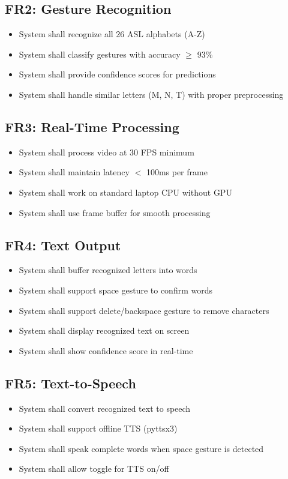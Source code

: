 \subsection{FR2: Gesture Recognition}
\begin{itemize}
    \item System shall recognize all 26 ASL alphabets (A-Z)
    \item System shall classify gestures with accuracy $\ge$ 93\%
    \item System shall provide confidence scores for predictions
    \item System shall handle similar letters (M, N, T) with proper preprocessing
\end{itemize}

\subsection{FR3: Real-Time Processing}
\begin{itemize}
    \item System shall process video at 30 FPS minimum
    \item System shall maintain latency $<$ 100ms per frame
    \item System shall work on standard laptop CPU without GPU
    \item System shall use frame buffer for smooth processing
\end{itemize}

\subsection{FR4: Text Output}
\begin{itemize}
    \item System shall buffer recognized letters into words
    \item System shall support space gesture to confirm words
    \item System shall support delete/backspace gesture to remove characters
    \item System shall display recognized text on screen
    \item System shall show confidence score in real-time
\end{itemize}

\subsection{FR5: Text-to-Speech}
\begin{itemize}
    \item System shall convert recognized text to speech
    \item System shall support offline TTS (pyttsx3)
    \item System shall speak complete words when space gesture is detected
    \item System shall allow toggle for TTS on/off
\end{itemize}

